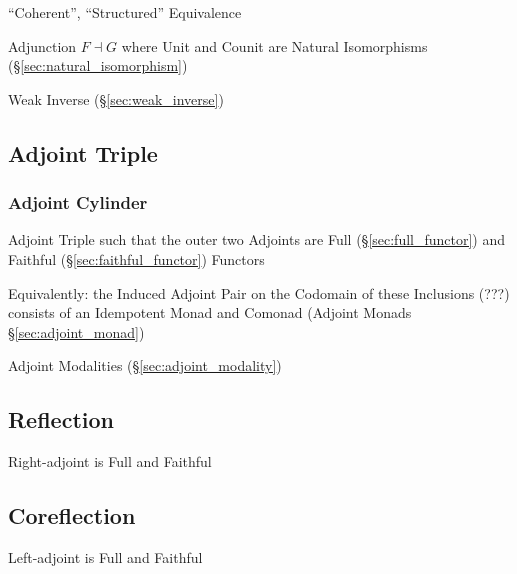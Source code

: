 ``Coherent'', ``Structured'' Equivalence

Adjunction $F \dashv G$ where Unit and Counit are Natural Isomorphisms
(\S\ref{sec:natural_isomorphism})

Weak Inverse (\S\ref{sec:weak_inverse})



\subsection{Adjoint Triple}\label{sec:adjoint_triple}

\subsubsection{Adjoint Cylinder}\label{sec:adjoint_cylinder}

Adjoint Triple such that the outer two Adjoints are Full
(\S\ref{sec:full_functor}) and Faithful (\S\ref{sec:faithful_functor})
Functors

Equivalently: the Induced Adjoint Pair on the Codomain of these
Inclusions (???) consists of an Idempotent Monad and Comonad (Adjoint
Monads \S\ref{sec:adjoint_monad})

Adjoint Modalities (\S\ref{sec:adjoint_modality})



\subsection{Reflection}\label{sec:reflection_adjunction}

\cite{winskel-nielsen93}

Right-adjoint is Full and Faithful



\subsection{Coreflection}\label{sec:coreflection_adjunction}

\cite{winskel-nielsen93}

Left-adjoint is Full and Faithful



